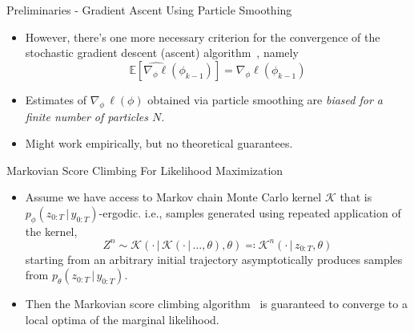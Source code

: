 \documentclass[10pt, aspectratio=1610]{beamer}
\newcommand{\given}{\,|\,}
\begin{document}
    \begin{frame}{Preliminaries - Gradient Ascent Using Particle Smoothing}
      \begin{itemize}[<+->]
        \item However, there's one more necessary criterion for the convergence of the stochastic gradient descent (ascent) algorithm~\citep{robbins1951stochastic}, namely
          \begin{equation}
            \mathbb{E}\left[\widehat{\nabla_\phi \ell}(\phi_{k-1})\right] = \nabla_\phi \ell(\phi_{k-1})
          \end{equation}
        \item Estimates of $\nabla_\phi \, \ell(\phi)$ obtained via particle smoothing are \emph{biased for a finite number of particles $N$}.
        \item Might work empirically, but no theoretical guarantees.
      \end{itemize}
    \end{frame}

    \begin{frame}{Markovian Score Climbing For Likelihood Maximization}
      \begin{itemize}[<+->]
        \item Assume we have access to Markov chain Monte Carlo kernel $\mathcal{K}$ that is $p_\phi(z_{0:T} \given y_{0:T})$-ergodic. i.e., samples generated using repeated application of the kernel, $$Z^n \sim \mathcal{K}(\cdot \given \mathcal{K}(\cdot \given \ldots, \theta), \theta) \eqqcolon \mathcal{K}^n(\cdot \given z_{0:T}, \theta)$$ starting from an arbitrary initial trajectory asymptotically produces samples from $p_\theta(z_{0:T} \given y_{0:T})$.
        \item Then the Markovian score climbing algorithm~\citep{gu1998stochastic, naesseth2020markovian} is guaranteed to converge to a local optima of the marginal likelihood.
        \end{itemize}
    \end{frame}
\end{document}
